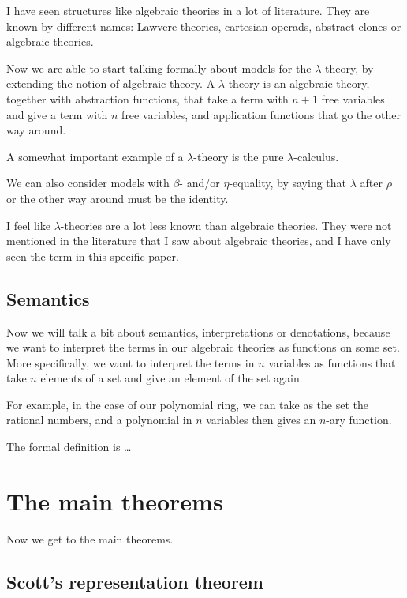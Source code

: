 \documentclass{amsart}
\begin{document}
  I have seen structures like algebraic theories in a lot of literature. They are known by different names: Lawvere theories, cartesian operads, abstract clones or algebraic theories.

  Now we are able to start talking formally about models for the $ \lambda $-theory, by extending the notion of algebraic theory. A $ \lambda $-theory is an algebraic theory, together with abstraction functions, that take a term with $ n + 1 $ free variables and give a term with $ n $ free variables, and application functions that go the other way around.

  A somewhat important example of a $ \lambda $-theory is the pure $ \lambda $-calculus.

  We can also consider models with $ \beta $- and/or $ \eta $-equality, by saying that $ \lambda $ after $ \rho $ or the other way around must be the identity.

  I feel like $ \lambda $-theories are a lot less known than algebraic theories. They were not mentioned in the literature that I saw about algebraic theories, and I have only seen the term in this specific paper.

  \subsection{Semantics}

  Now we will talk a bit about semantics, interpretations or denotations, because we want to interpret the terms in our algebraic theories as functions on some set. More specifically, we want to interpret the terms in $ n $ variables as functions that take $ n $ elements of a set and give an element of the set again.

  For example, in the case of our polynomial ring, we can take as the set the rational numbers, and a polynomial in $ n $ variables then gives an $ n $-ary function.

  The formal definition is \dots

  \section{The main theorems}

  Now we get to the main theorems.

  \subsection{Scott's representation theorem}
\end{document}
